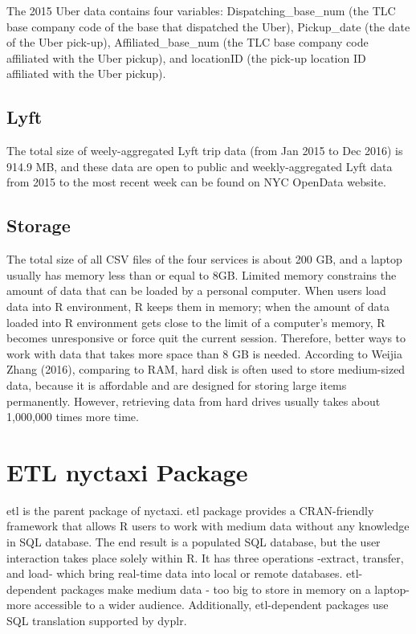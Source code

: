 \documentclass[12pt,twoside]{reedthesis}
\theoremstyle{definition}
\theoremstyle{definition}
\theoremstyle{definition}
\theoremstyle{remark}
\begin{document}
The 2015 Uber data contains four variables: Dispatching\_base\_num (the
TLC base company code of the base that dispatched the Uber),
Pickup\_date (the date of the Uber pick-up), Affiliated\_base\_num (the
TLC base company code affiliated with the Uber pickup), and locationID
(the pick-up location ID affiliated with the Uber pickup).

\subsection{Lyft}\label{lyft-2}

The total size of weely-aggregated Lyft trip data (from Jan 2015 to Dec
2016) is 914.9 MB, and these data are open to public and
weekly-aggregated Lyft data from 2015 to the most recent week can be
found on NYC OpenData website.

\subsection{Storage}\label{storage}

The total size of all CSV files of the four services is about 200 GB,
and a laptop usually has memory less than or equal to 8GB. Limited
memory constrains the amount of data that can be loaded by a personal
computer. When users load data into R environment, R keeps them in
memory; when the amount of data loaded into R environment gets close to
the limit of a computer's memory, R becomes unresponsive or force quit
the current session. Therefore, better ways to work with data that takes
more space than 8 GB is needed. According to Weijia Zhang (2016),
comparing to RAM, hard disk is often used to store medium-sized data,
because it is affordable and are designed for storing large items
permanently. However, retrieving data from hard drives usually takes
about 1,000,000 times more time.

\section{ETL nyctaxi Package}\label{etl-nyctaxi-package}

etl is the parent package of nyctaxi. etl package provides a
CRAN-friendly framework that allows R users to work with medium data
without any knowledge in SQL database. The end result is a populated SQL
database, but the user interaction takes place solely within R. It has
three operations -extract, transfer, and load- which bring real-time
data into local or remote databases. etl-dependent packages make medium
data - too big to store in memory on a laptop- more accessible to a
wider audience. Additionally, etl-dependent packages use SQL translation
supported by dyplr.
\end{document}
